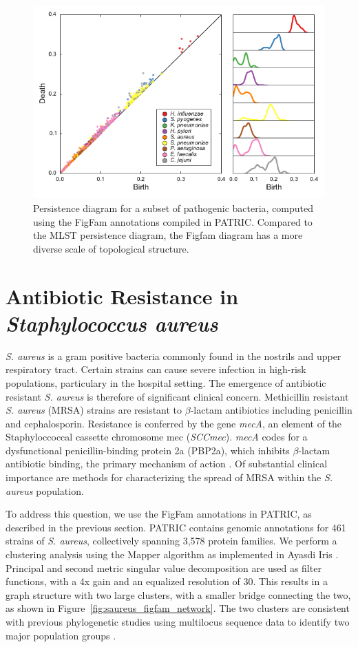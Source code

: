 \begin{figure}
\centering
\includegraphics[width=\textwidth]{./fig/figfam_persistent_diagram.pdf}
\caption{Persistence diagram for a subset of pathogenic bacteria, computed using the FigFam annotations compiled in PATRIC. Compared to the MLST persistence diagram, the Figfam diagram has a more diverse scale of topological structure.}
\label{fig:figfam_persistence_diagram}
\end{figure}

\section{Antibiotic Resistance in \emph{Staphylococcus aureus}}
\label{sec:staph_aureus}
%
\emph{S. aureus} is a gram positive bacteria commonly found in the nostrils and upper respiratory tract.
Certain strains can cause severe infection in high-risk populations, particulary in the hospital setting.
The emergence of antibiotic resistant \emph{S. aureus} is therefore of significant clinical concern.
Methicillin resistant \emph{S. aureus} (MRSA) strains are resistant to $\beta$-lactam antibiotics including penicillin and cephalosporin.
Resistance is conferred by the gene \emph{mecA}, an element of the Staphyloccoccal cassette chromosome mec (\emph{SCCmec}).
\emph{mecA} codes for a dysfunctional penicillin-binding protein 2a (PBP2a), which inhibits $\beta$-lactam antibiotic binding, the primary mechanism of action \cite{Jensen:2009fu}.
Of substantial clinical importance are methods for characterizing the spread of MRSA within the \emph{S. aureus} population.

To address this question, we use the FigFam annotations in PATRIC, as described in the previous section.
PATRIC contains genomic annotations for 461 strains of \emph{S. aureus}, collectively spanning 3,578 protein families.
We perform a clustering analysis using the Mapper algorithm as implemented in Ayasdi Iris \cite{AyasdiIris:2015}.
Principal and second metric singular value decomposition are used as filter functions, with a 4x gain and an equalized resolution of 30.
This results in a graph structure with two large clusters, with a smaller bridge connecting the two, as shown in Figure~\ref{fig:saureus_figfam_network}.
The two clusters are consistent with previous phylogenetic studies using multilocus sequence data to identify two major population groups \cite{Cooper:2006dp}.

